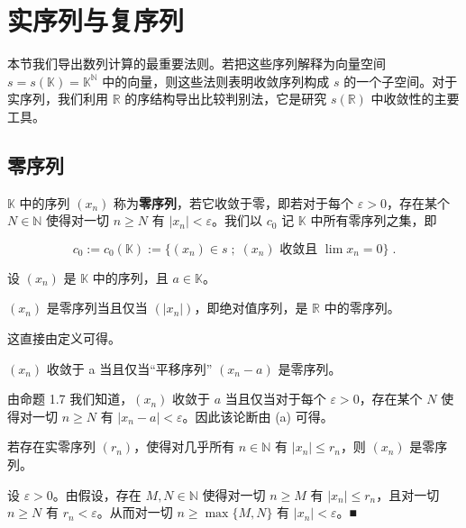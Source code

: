 \section{实序列与复序列}

本节我们导出数列计算的最重要法则。若把这些序列解释为向量空间 $ s = s(\mathbb{K}) = \mathbb{K}^{\mathbb{N}} $ 中的向量，则这些法则表明收敛序列构成 $ s $ 的一个子空间。对于实序列，我们利用 $ \mathbb{R} $ 的序结构导出比较判别法，它是研究 $ s(\mathbb{R}) $ 中收敛性的主要工具。

\subsection*{零序列}

$ \mathbb{K} $ 中的序列 $ (x_n) $ 称为\textbf{零序列}，若它收敛于零，即若对于每个 $ \varepsilon > 0 $，存在某个 $ N \in \mathbb{N} $ 使得对一切 $ n \geq N $ 有 $ |x_n| < \varepsilon $。我们以 $ c_0 $ 记 $ \mathbb{K} $ 中所有零序列之集，即

\[
c_{0}:=c_{0}(\mathbb{K}):=\big\{(x_{n})\in s\;;\;(x_{n})\text{ 收敛且 }\operatorname*{l i m}x_{n}=0\big\}\;.
\]

\begin{remark}

设 $ (x_n) $ 是 $ \mathbb{K} $ 中的序列，且 $ a \in \mathbb{K} $。

\begin{items}
\item

$ (x_n) $ 是零序列当且仅当 $ (|x_n|) $，即绝对值序列，是 $ \mathbb{R} $ 中的零序列。

\proofhead
这直接由定义可得。
\item

$ (x_{n}) $ 收敛于 a 当且仅当“平移序列” $ (x_{n}-a) $ 是零序列。

\proofhead
由命题 1.7 我们知道，$(x_n)$ 收敛于 $a$ 当且仅当对于每个 $\varepsilon > 0$，存在某个 $N$ 使得对一切 $n \geq N$ 有 $|x_n - a| < \varepsilon$。因此该论断由 (a) 可得。
\item

若存在实零序列 $ (r_n) $，使得对几乎所有 $ n \in \mathbb{N} $ 有 $ |x_n| \leq r_n $，则 $ (x_n) $ 是零序列。

\proofhead
设 $ \varepsilon > 0 $。由假设，存在 $ M, N \in \mathbb{N} $ 使得对一切 $ n \geq M $ 有 $ |x_n| \leq r_n $，且对一切 $ n \geq N $ 有 $ r_n < \varepsilon $。从而对一切 $ n \geq \max\{M, N\} $ 有 $ |x_n| < \varepsilon $。■
\end{items}

\end{remark}

